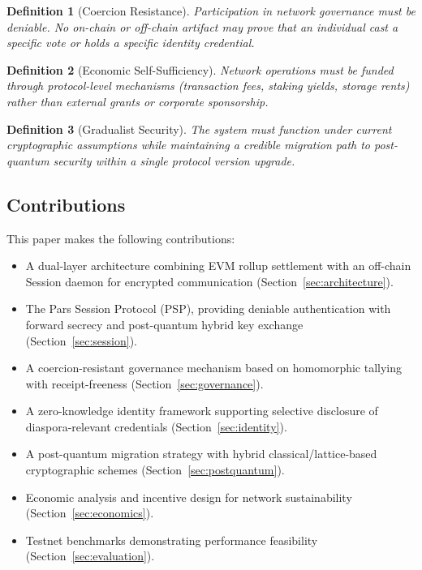 \documentclass[11pt,a4paper]{article}
\newtheorem{definition}{Definition}
\begin{document}
\begin{definition}[Coercion Resistance]
Participation in network governance must be deniable. No on-chain or off-chain artifact may prove that an individual cast a specific vote or holds a specific identity credential.
\end{definition}

\begin{definition}[Economic Self-Sufficiency]
Network operations must be funded through protocol-level mechanisms (transaction fees, staking yields, storage rents) rather than external grants or corporate sponsorship.
\end{definition}

\begin{definition}[Gradualist Security]
The system must function under current cryptographic assumptions while maintaining a credible migration path to post-quantum security within a single protocol version upgrade.
\end{definition}

\subsection{Contributions}

This paper makes the following contributions:

\begin{itemize}
    \item A dual-layer architecture combining EVM rollup settlement with an off-chain Session daemon for encrypted communication (Section~\ref{sec:architecture}).
    \item The Pars Session Protocol (PSP), providing deniable authentication with forward secrecy and post-quantum hybrid key exchange (Section~\ref{sec:session}).
    \item A coercion-resistant governance mechanism based on homomorphic tallying with receipt-freeness (Section~\ref{sec:governance}).
    \item A zero-knowledge identity framework supporting selective disclosure of diaspora-relevant credentials (Section~\ref{sec:identity}).
    \item A post-quantum migration strategy with hybrid classical/lattice-based cryptographic schemes (Section~\ref{sec:postquantum}).
    \item Economic analysis and incentive design for network sustainability (Section~\ref{sec:economics}).
    \item Testnet benchmarks demonstrating performance feasibility (Section~\ref{sec:evaluation}).
\end{itemize}
\end{document}
